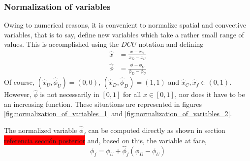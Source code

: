 \subsubsection{Normalization of variables}

Owing to numerical reasons, it is convenient to normalize spatial and convective variables, that is to say, define new variables which take a rather small range of values. This is accomplished using the $DCU$ notation and defining 
\begin{align*}
	\hat{x} &= \frac{x - x_U}{x_D - x_U} \\
	\hat{\phi} &= \frac{\phi - \phi_U}{\phi_D - \phi_U}
\end{align*}
Of course, $(\hat{x}_U, \hat{\phi}_U) = (0,0)$, $(\hat{x}_D, \hat{\phi}_D) = (1,1)$ and $\hat{x}_C, \hat{x}_f \in (0,1)$. However, $\hat{\phi}$ is not necessarily in $[0,1]$ for all $x \in [0,1]$, nor does it have to be an increasing function. These situations are represented in figures \ref{fig:normalization_of_variables_1} and \ref{fig:normalization_of_variables_2}.

The normalized variable $\hat{\phi}_f$ can be computed directly as shown in section \colorbox{red}{referencia sección posterior} and, based on this, the variable at face,
\begin{equation}
	\phi_f = \phi_U + \hat{\phi}_f (\phi_D - \phi_U)
\end{equation}

